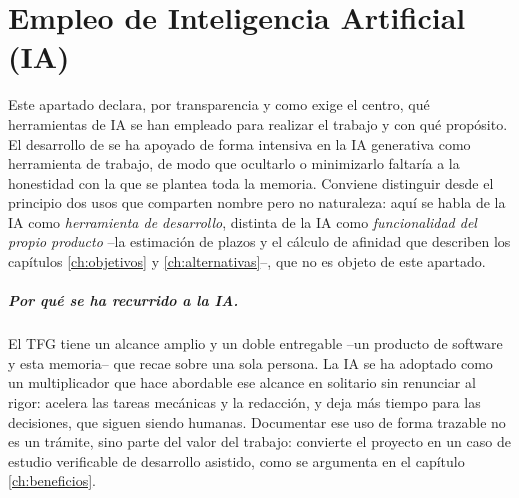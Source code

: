 
\chapter*{Empleo de Inteligencia Artificial (IA)}

Este apartado declara, por transparencia y como exige el centro, qué herramientas de \ac{IA} se han empleado para realizar el trabajo y con qué propósito.
El desarrollo de \bukit se ha apoyado de forma intensiva en la \ac{IA} generativa como herramienta de trabajo, de modo que ocultarlo o minimizarlo faltaría a la honestidad con la que se plantea toda la memoria.
Conviene distinguir desde el principio dos usos que comparten nombre pero no naturaleza: aquí se habla de la \ac{IA} como \emph{herramienta de desarrollo}, distinta de la \ac{IA} como \emph{funcionalidad del propio producto} --la estimación de plazos y el cálculo de afinidad que describen los capítulos \ref{ch:objetivos} y \ref{ch:alternativas}--, que no es objeto de este apartado.

\paragraph{Por qué se ha recurrido a la \acs{IA}.}
El \ac{TFG} tiene un alcance amplio y un doble entregable --un producto de software y esta memoria-- que recae sobre una sola persona.
La \ac{IA} se ha adoptado como un multiplicador que hace abordable ese alcance en solitario sin renunciar al rigor: acelera las tareas mecánicas y la redacción, y deja más tiempo para las decisiones, que siguen siendo humanas.
Documentar ese uso de forma trazable no es un trámite, sino parte del valor del trabajo: convierte el proyecto en un caso de estudio verificable de desarrollo asistido, como se argumenta en el capítulo \ref{ch:beneficios}.

